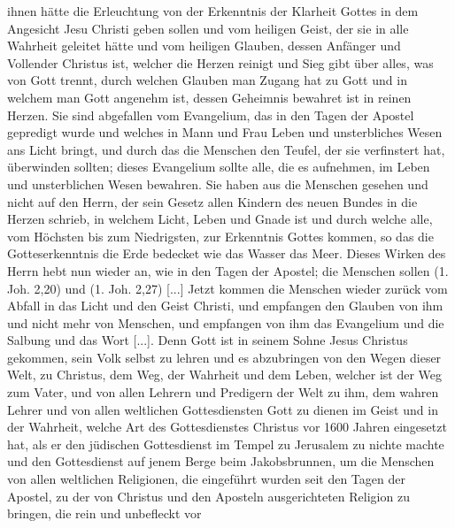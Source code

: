 {  ihnen hätte die Erleuchtung von der Erkenntnis der Klarheit
  Gottes in dem Angesicht Jesu Christi geben sollen und vom heiligen
  Geist, der sie in alle Wahrheit geleitet hätte und vom heiligen
  Glauben, dessen Anfänger und Vollender Christus ist, welcher
  die Herzen reinigt und Sieg gibt über alles, was von Gott trennt,
  durch welchen Glauben man Zugang hat zu Gott und in welchem
  man Gott angenehm ist, dessen Geheimnis bewahret ist in reinen
  Herzen. Sie sind abgefallen vom Evangelium, das in den Tagen
  der Apostel gepredigt wurde und welches in Mann und Frau
  Leben und unsterbliches Wesen ans Licht bringt, und durch das
  die Menschen den Teufel, der sie verfinstert hat, überwinden
  sollten; dieses Evangelium sollte alle, die es aufnehmen, im Leben
  und unsterblichen Wesen bewahren. Sie haben aus die Menschen
  gesehen und nicht auf den Herrn, der sein Gesetz allen Kindern
  des neuen Bundes in die Herzen schrieb, in welchem Licht, Leben
  und Gnade ist und durch welche alle, vom Höchsten bis zum
  Niedrigsten, zur Erkenntnis Gottes kommen, so das die 
  Gotteserkenntnis die Erde bedecket wie das Wasser das Meer. Dieses
  Wirken des Herrn hebt nun wieder an, wie in den Tagen der
  Apostel; die Menschen sollen  
  (1. Joh. 2,20) und 
   (1. Joh. 2,27) 
  [...] Jetzt kommen die Menschen wieder
  zurück vom Abfall in das Licht und den Geist Christi, und
  empfangen den Glauben von ihm und nicht mehr von Menschen,
  und empfangen von ihm das Evangelium und die Salbung und
  das Wort [...]. Denn Gott ist in seinem Sohne Jesus Christus
  gekommen, sein Volk selbst zu lehren und es abzubringen von
  den Wegen dieser Welt, zu Christus, dem Weg, der Wahrheit
  und dem Leben, welcher ist der Weg zum Vater, und von allen
  Lehrern und Predigern der Welt zu ihm, dem wahren Lehrer
  und von allen weltlichen Gottesdiensten Gott zu dienen
  im Geist und in der Wahrheit, welche Art des Gottesdienstes
  Christus vor 1600 Jahren eingesetzt hat, als er den jüdischen
  Gottesdienst im Tempel zu Jerusalem 
  zu nichte machte und den
  Gottesdienst auf jenem Berge beim Jakobsbrunnen, um die
  Menschen von allen weltlichen Religionen, die eingeführt wurden
  seit den Tagen der Apostel, zu der von Christus und den Aposteln
  ausgerichteten Religion zu bringen, die rein und unbefleckt vor
}
